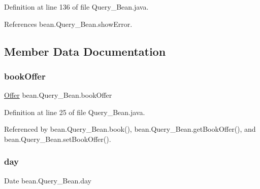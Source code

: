 Definition at line 136 of file Query\+\_\+\+Bean.\+java.


\begin{DoxyCode}{0}

\end{DoxyCode}


References bean.\+Query\+\_\+\+Bean.\+show\+Error.



\subsection{Member Data Documentation}
\mbox{\label{classbean_1_1Query__Bean_ab3019b29aceba9be1d718c06f02efbf0}} 
\subsubsection{\texorpdfstring{bookOffer}{bookOffer}}
{\footnotesize\ttfamily \mbox{\hyperlink{classdomain_1_1Offer}{Offer}} bean.\+Query\+\_\+\+Bean.\+book\+Offer\hspace{0.3cm}{\ttfamily [package]}}



Definition at line 25 of file Query\+\_\+\+Bean.\+java.



Referenced by bean.\+Query\+\_\+\+Bean.\+book(), bean.\+Query\+\_\+\+Bean.\+get\+Book\+Offer(), and bean.\+Query\+\_\+\+Bean.\+set\+Book\+Offer().

\mbox{\label{classbean_1_1Query__Bean_a84d256eca7a4f868d77e549b82d87ddf}} 
\subsubsection{\texorpdfstring{day}{day}}
{\footnotesize\ttfamily Date bean.\+Query\+\_\+\+Bean.\+day\hspace{0.3cm}{\ttfamily [package]}}



